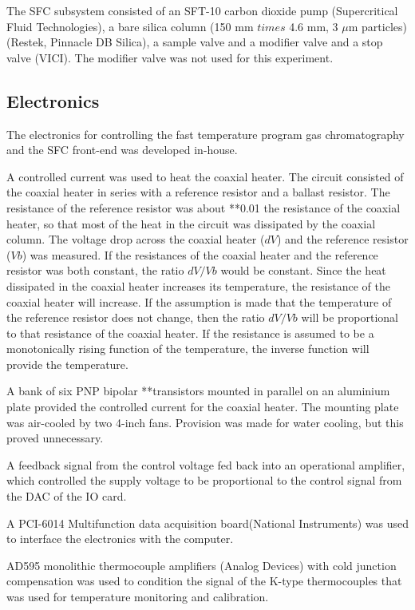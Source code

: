 \documentclass[aip,rsi,preprint,graphicx]{revtex4-1} %
\begin{document}
The SFC subsystem consisted of an SFT-10 carbon dioxide pump (Supercritical Fluid Technologies), a bare silica column (150 mm $times$ 4.6 mm, 3 $\mu$m particles) (Restek, Pinnacle DB Silica), a sample valve and a modifier valve and a stop valve (VICI). The modifier valve was not used for this experiment. 

\subsection{Electronics}

The electronics for controlling the fast temperature program gas chromatography and the SFC front-end was developed in-house.

A controlled current was used to heat the coaxial heater. The circuit consisted of the coaxial heater in series with a reference resistor and a ballast resistor. The resistance of the reference resistor was about **0.01 the resistance of the coaxial heater, so that most of the  heat in the circuit was dissipated by the coaxial column. The voltage drop across the coaxial heater ($dV$) and the reference resistor ($Vb$) was measured. If the resistances of the coaxial heater and the reference resistor was both constant, the ratio $dV/Vb$ would be constant. Since the heat dissipated in the coaxial heater increases its temperature, the resistance of the coaxial heater will increase. If the assumption is made that the temperature of the reference resistor does not change, then the ratio $dV/Vb$ will be proportional to that resistance of the coaxial heater. If the resistance is assumed to be a monotonically rising function of the temperature, the inverse function will provide the temperature. 

A bank of six PNP bipolar **transistors mounted in parallel on an aluminium plate provided the controlled current for the coaxial heater. The mounting plate was air-cooled by two 4-inch fans. Provision was made for water cooling, but this proved unnecessary. 

A feedback signal from the control voltage fed back into an operational amplifier, which controlled the supply voltage to be proportional to the control signal from the DAC of the IO card.

A PCI-6014 Multifunction data acquisition board(National Instruments) was used to interface the electronics with the computer. 

AD595 monolithic thermocouple amplifiers (Analog Devices) with cold junction compensation was used to condition the signal of the K-type thermocouples that was used for temperature monitoring and calibration. 
\end{document}
